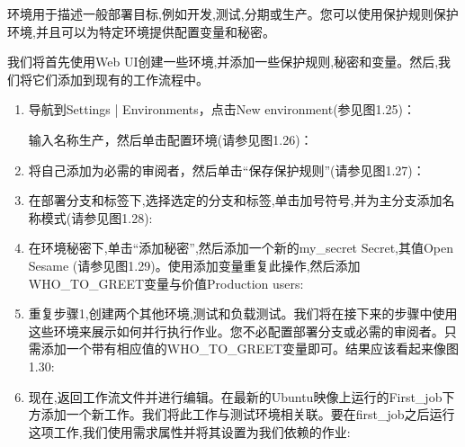 
环境用于描述一般部署目标,例如开发,测试,分期或生产。您可以使用保护规则保护环境,并且可以为特定环境提供配置变量和秘密。


我们将首先使用Web UI创建一些环境,并添加一些保护规则,秘密和变量。然后,我们将它们添加到现有的工作流程中。


\begin{enumerate}
\item 
导航到Settings | Environments，点击New environment(参见图1.25)：


输入名称生产，然后单击配置环境(请参见图1.26)：


\item 
将自己添加为必需的审阅者，然后单击“保存保护规则”(请参见图1.27)：


\item 
在部署分支和标签下,选择选定的分支和标签,单击加号符号,并为主分支添加名称模式(请参见图1.28):


\item 
在环境秘密下,单击“添加秘密”,然后添加一个新的my\_secret Secret,其值Open Sesame (请参见图1.29)。使用添加变量重复此操作,然后添加WHO\_TO\_GREET变量与价值Production users:


\item 
重复步骤1,创建两个其他环境,测试和负载测试。我们将在接下来的步骤中使用这些环境来展示如何并行执行作业。您不必配置部署分支或必需的审阅者。只需添加一个带有相应值的WHO\_TO\_GREET变量即可。结果应该看起来像图1.30:


\item 
现在,返回工作流文件并进行编辑。在最新的Ubuntu映像上运行的First\_job下方添加一个新工作。我们将此工作与测试环境相关联。要在first\_job之后运行这项工作,我们使用需求属性并将其设置为我们依赖的作业:


\end{enumerate}
